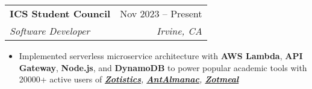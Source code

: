 \documentclass[letterpaper,11pt]{article}
\makeatletter
\newcommand{\resumeItem}[1]{
  \item\small{
    {#1 \vspace{-2pt}}
  }
}
\newcommand{\resumeSubheading}[4]{
  \vspace{-2pt}\item
    \begin{tabular*}{0.97\textwidth}[t]{l@{\extracolsep{\fill}}r}
      \textbf{#1} & #2 \\
      \textit{\small#3} & \textit{\small #4} \\
    \end{tabular*}\vspace{-7pt}
}
\newcommand{\resumeItemListStart}{\begin{itemize}}
\newcommand{\resumeItemListEnd}{\end{itemize}\vspace{-5pt}}
\makeatother
\begin{document}
    \resumeSubheading
      {ICS Student Council}{Nov 2023 -- Present}
      {Software Developer}{Irvine, CA}
      \resumeItemListStart
          \resumeItem{Implemented serverless microservice architecture with \textbf{AWS Lambda}, \textbf{API Gateway}, \textbf{Node.js}, and \textbf{DynamoDB} to power popular academic tools with 20000+ active users of \it{\textbf{\href{https://zotistics.com/}{Zotistics}}}, \it{\textbf{\href{https://antalmanac.com/}{AntAlmanac}}}, \it{\textbf{\href{https://apps.apple.com/us/app/zotmeal/id1551606266}{Zotmeal}}}}

      \resumeItemListEnd
      


      
      
\end{document}
